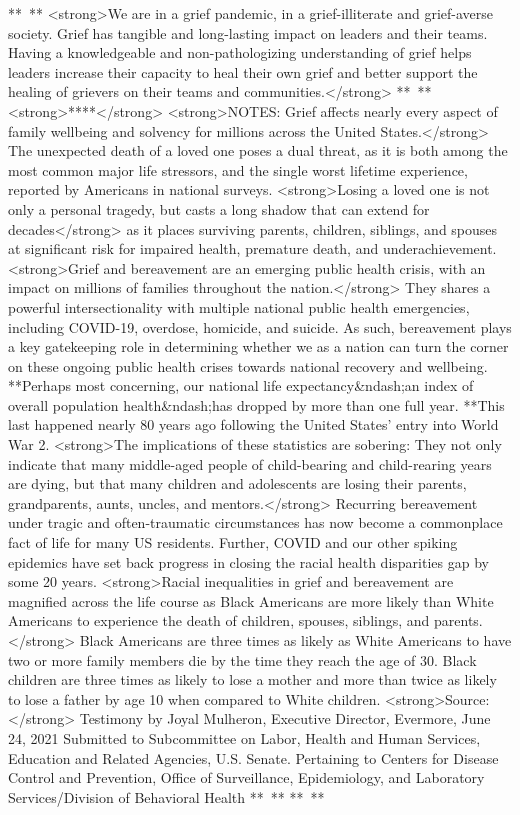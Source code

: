 \documentclass{report}
\begin{document}
              ** **
<strong>We are in a grief pandemic, in a grief-illiterate and grief-averse society. Grief has tangible and long-lasting impact on leaders and their teams. Having a knowledgeable and non-pathologizing understanding of grief helps leaders increase their capacity to heal their own grief and better support the healing of grievers on their teams and communities.</strong>
** **
<strong>****</strong>
<strong>NOTES: Grief affects nearly every aspect of family wellbeing and solvency for millions across the United States.</strong> The unexpected death of a loved one poses a dual threat, as it is both among the most common major life stressors, and the single worst lifetime experience, reported by Americans in national surveys.
<strong>Losing a loved one is not only a personal tragedy, but casts a long shadow that can extend for decades</strong> as it places surviving parents, children, siblings, and spouses at significant risk for impaired health, premature death, and underachievement.
<strong>Grief and bereavement are an emerging public health crisis, with an impact on millions of families throughout the nation.</strong> They shares a powerful intersectionality with multiple national public health emergencies, including COVID-19, overdose, homicide, and suicide. As such, bereavement plays a key gatekeeping role in determining whether we as a nation can turn the corner on these ongoing public health crises towards national recovery and wellbeing.
**Perhaps most concerning, our national life expectancy\&ndash;an index of overall population health\&ndash;has dropped by more than one full year. **This last happened nearly 80 years ago following the United States’ entry into World War 2.
<strong>The implications of these statistics are sobering: They not only indicate that many middle-aged people of child-bearing and child-rearing years are dying, but that many children and adolescents are losing their parents, grandparents, aunts, uncles, and mentors.</strong> Recurring bereavement under tragic and often-traumatic circumstances has now become a commonplace fact of life for many US residents. Further, COVID and our other spiking epidemics have set back progress in closing the racial health disparities gap by some 20 years.
<strong>Racial inequalities in grief and bereavement are magnified across the life course as Black Americans are more likely than White Americans to experience the death of children, spouses, siblings, and parents.</strong> Black Americans are three times as likely as White Americans to have two or more family members die by the time they reach the age of 30. Black children are three times as likely to lose a mother and more than twice as likely to lose a father by age 10 when compared to White children.
<strong>Source:</strong> Testimony by Joyal Mulheron, Executive Director, Evermore, June 24, 2021 Submitted to Subcommittee on Labor, Health and Human Services, Education and Related Agencies, U.S. Senate. Pertaining to Centers for Disease Control and Prevention, Office of Surveillance, Epidemiology, and Laboratory Services/Division of Behavioral Health
** **
** **
\end{document}
